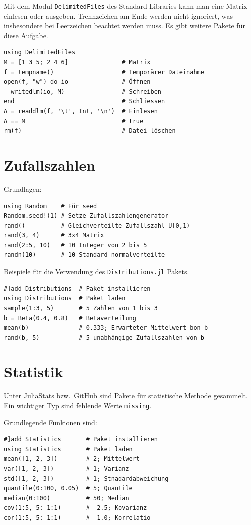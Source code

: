 \documentclass[10pt,twocolumn]{scrartcl}
\begin{document}
Mit dem Modul \lstinline|DelimitedFiles| des Standard Libraries kann man eine
Matrix einlesen oder ausgeben. Trennzeichen am Ende werden nicht ignoriert, was
insbesondere bei Leerzeichen beachtet werden muss. Es gibt weitere Pakete für
diese Aufgabe.

\begin{lstlisting}
using DelimitedFiles
M = [1 3 5; 2 4 6]               # Matrix
f = tempname()                   # Temporärer Dateinahme
open(f, "w") do io               # Öffnen
  writedlm(io, M)                # Schreiben
end                              # Schliessen
A = readdlm(f, '\t', Int, '\n')  # Einlesen
A == M                           # true
rm(f)                            # Datei löschen
\end{lstlisting}

\section{Zufallszahlen}
\label{sec:zufallszahlen}

Grundlagen:
\begin{lstlisting}
using Random    # Für seed
Random.seed!(1) # Setze Zufallszahlengenerator
rand()          # Gleichverteilte Zufallszahl U[0,1)
rand(3, 4)      # 3x4 Matrix
rand(2:5, 10)   # 10 Integer von 2 bis 5
randn(10)       # 10 Standard normalverteilte
\end{lstlisting}

Beispiele für die Verwendung des \lstinline|Distributions.jl| Pakets.
\begin{lstlisting}
#]add Distributions  # Paket installieren
using Distributions  # Paket laden
sample(1:3, 5)       # 5 Zahlen von 1 bis 3
b = Beta(0.4, 0.8)   # Betaverteilung
mean(b)              # 0.333; Erwarteter Mittelwert bon b
rand(b, 5)           # 5 unabhängige Zufallszahlen von b
\end{lstlisting}

\section{Statistik}
\label{sec:statistik}

Unter \href{https://juliastats.org/}{JuliaStats} bzw.\
\href{https://github.com/JuliaStats/}{GitHub} sind Pakete für statistische
Methode gesammelt. Ein wichtiger Typ sind \hyperref[sec:weitereTypen]{fehlende
Werte} \lstinline|missing|.

Grundlegende Funkionen sind:
\begin{lstlisting}
#]add Statistics       # Paket installieren
using Statistics       # Paket laden
mean([1, 2, 3])        # 2; Mittelwert
var([1, 2, 3])         # 1; Varianz
std([1, 2, 3])         # 1; Stnadardabweichung
quantile(0:100, 0.05)  # 5; Quantile
median(0:100)          # 50; Median
cov(1:5, 5:-1:1)       # -2.5; Kovarianz
cor(1:5, 5:-1:1)       # -1.0; Korrelatio
\end{lstlisting}
\end{document}

